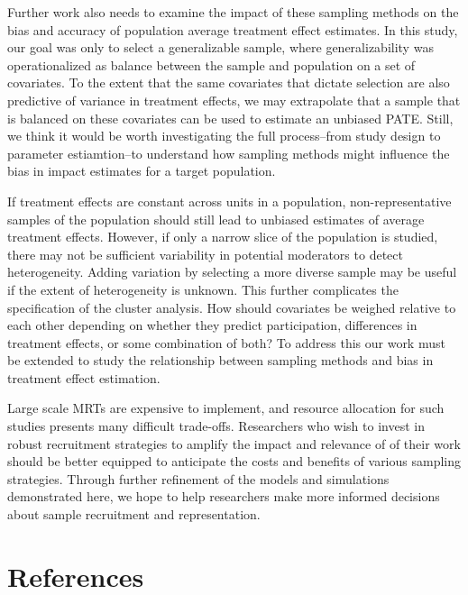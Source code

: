 \documentclass[english,man,floatsintext]{apa6}
\begin{document}
Further work also needs to examine the impact of these sampling methods on the bias and accuracy of population average treatment effect estimates. In this study, our goal was only to select a generalizable sample, where generalizability was operationalized as balance between the sample and population on a set of covariates. To the extent that the same covariates that dictate selection are also predictive of variance in treatment effects, we may extrapolate that a sample that is balanced on these covariates can be used to estimate an unbiased PATE. Still, we think it would be worth investigating the full process--from study design to parameter estiamtion--to understand how sampling methods might influence the bias in impact estimates for a target population.

If treatment effects are constant across units in a population, non-representative samples of the population should still lead to unbiased estimates of average treatment effects. However, if only a narrow slice of the population is studied, there may not be sufficient variability in potential moderators to detect heterogeneity. Adding variation by selecting a more diverse sample may be useful if the extent of heterogeneity is unknown. This further complicates the specification of the cluster analysis. How should covariates be weighed relative to each other depending on whether they predict participation, differences in treatment effects, or some combination of both? To address this our work must be extended to study the relationship between sampling methods and bias in treatment effect estimation.

Large scale MRTs are expensive to implement, and resource allocation for such studies presents many difficult trade-offs. Researchers who wish to invest in robust recruitment strategies to amplify the impact and relevance of of their work should be better equipped to anticipate the costs and benefits of various sampling strategies. Through further refinement of the models and simulations demonstrated here, we hope to help researchers make more informed decisions about sample recruitment and representation.

\newpage

\hypertarget{references}{%
\section{References}\label{references}}
\end{document}
